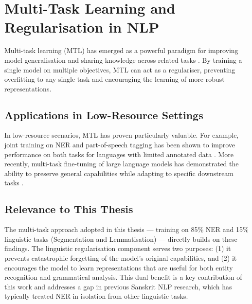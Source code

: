 \section{Multi-Task Learning and Regularisation in NLP}
\label{sec:multi_task}

Multi-task learning (MTL) has emerged as a powerful paradigm for improving model generalisation and sharing knowledge across related tasks \cite{caruana1997multitask, ruder2017overview}. By training a single model on multiple objectives, MTL can act as a regulariser, preventing overfitting to any single task and encouraging the learning of more robust representations.

\subsection{Applications in Low-Resource Settings}
\label{subsec:mtl_low_resource}

In low-resource scenarios, MTL has proven particularly valuable. For example, joint training on NER and part-of-speech tagging has been shown to improve performance on both tasks for languages with limited annotated data \cite{yang2017transfer}. More recently, multi-task fine-tuning of large language models has demonstrated the ability to preserve general capabilities while adapting to specific downstream tasks \cite{sanh2022t0}.

\subsection{Relevance to This Thesis}
\label{subsec:mtl_relevance}

The multi-task approach adopted in this thesis — training on 85\% NER and 15\% linguistic tasks (Segmentation and Lemmatisation) — directly builds on these findings. The linguistic regularisation component serves two purposes: (1) it prevents catastrophic forgetting of the model's original capabilities, and (2) it encourages the model to learn representations that are useful for both entity recognition and grammatical analysis. This dual benefit is a key contribution of this work and addresses a gap in previous Sanskrit NLP research, which has typically treated NER in isolation from other linguistic tasks.

